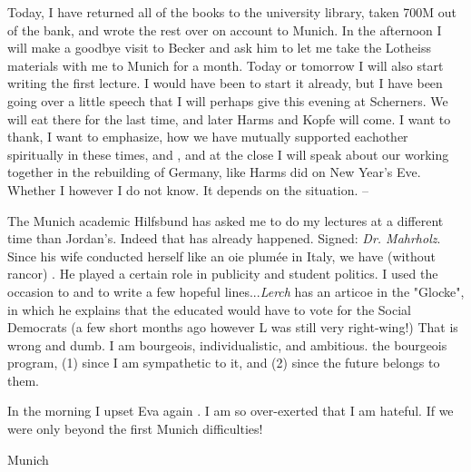 
\missing

Today, I have returned all of the books to the university library, taken 700M out of the bank, and wrote the rest over on account to Munich. In the afternoon I will make a goodbye visit to Becker and ask him to let me take the Lotheiss materials with me to Munich for a month. Today or tomorrow I will also start writing the first lecture. I would have been to start it already, but I have been going over a little speech that I will perhaps give this evening at Scherners. We will eat there for the last time, and later Harms and Kopfe will come. I want to thank, I want to emphasize, how we have mutually supported eachother spiritually in these times, and , and at the close I will speak about our working together in the rebuilding of Germany,  like Harms did on New Year's Eve. Whether I  however I do not know. It depends on the situation. --

The Munich academic Hilfsbund has asked me to do my lectures at a different time than Jordan's. Indeed that has already happened. Signed: \textit{Dr. Mahrholz}. Since his wife conducted herself like an oie plumée in Italy, we have (without rancor) . He played a certain role in publicity and student politics. I used the occasion to  and to write a few hopeful lines...\textit{Lerch} has an articoe in the "Glocke", in which he explains that the educated would have to vote for the Social Democrats (a few short months ago however L was still very right-wing!) That is wrong and dumb. I am bourgeois, individualistic, and ambitious.  the bourgeois program, (1) since I am sympathetic to it, and (2) since the future belongs to them.

In the morning I upset Eva again . I am so over-exerted that I am hateful. If we were only beyond the first Munich difficulties!

Munich

